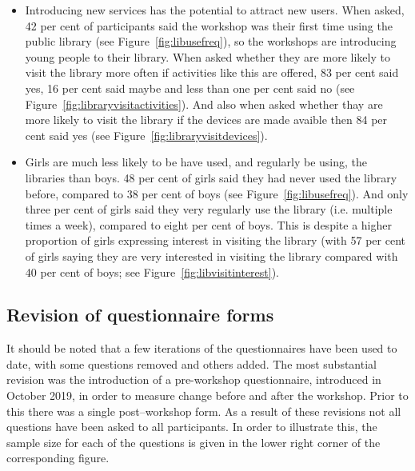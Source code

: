 \documentclass[12pt]{report} %
\begin{document}
\begin{itemize}
\item Introducing new services has the potential to attract new users. When asked, 42 per cent of participants said the workshop was their first time using the public library (see Figure~\ref{fig:libusefreq}), so the workshops are introducing young people to their library. When asked whether they are more likely to visit the library more often if activities like this are offered, 83 per cent said yes, 16 per cent said maybe and less than one per cent said no (see Figure~\ref{fig:libraryvisitactivities}). And also when asked whether thay are more likely to visit the library if the devices are made avaible then 84 per cent said yes (see Figure~\ref{fig:libraryvisitdevices}).

\item Girls are much less likely to be have used, and regularly be using, the libraries than boys. 48 per cent of girls said they had never used the library before, compared to 38 per cent of boys (see Figure~\ref{fig:libusefreq}). And only three per cent of girls said they very regularly use the library (i.e. multiple times a week), compared to eight per cent of boys. This is despite a higher proportion of girls expressing interest in visiting the library (with 57 per cent of girls saying they are very interested in visiting the library compared with 40 per cent of boys; see Figure~\ref{fig:libvisitinterest}). 
\end{itemize}
  
\subsection{Revision of questionnaire forms}
It should be noted that a few iterations of the questionnaires have been used to date, with some questions removed and others added. The most substantial revision was the introduction of a pre-workshop questionnaire, introduced in October 2019, in order to measure change before and after the workshop. Prior to this there was a single post--workshop form. As a result of these revisions not all questions have been asked to all participants. In order to illustrate this, the sample size for each of the questions is given in the lower right corner of the corresponding figure. 
\end{document}
